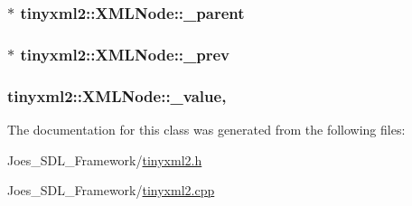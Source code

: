 \hypertarget{classtinyxml2_1_1_x_m_l_node_a176dd1c4965c21c366de192164aa2c13}{
\subsubsection[{\-\_\-parent}]{$\ast$ tinyxml2\-::\-X\-M\-L\-Node\-::\-\_\-parent\hspace{0.3cm}{\ttfamily [protected]}}}\label{classtinyxml2_1_1_x_m_l_node_a176dd1c4965c21c366de192164aa2c13}
\hypertarget{classtinyxml2_1_1_x_m_l_node_a9739eb0fb9a1188266052055e7a6bf6b}{
\subsubsection[{\-\_\-prev}]{$\ast$ tinyxml2\-::\-X\-M\-L\-Node\-::\-\_\-prev\hspace{0.3cm}{\ttfamily [protected]}}}\label{classtinyxml2_1_1_x_m_l_node_a9739eb0fb9a1188266052055e7a6bf6b}
\hypertarget{classtinyxml2_1_1_x_m_l_node_a3ea9884098b8379de2bb5ab3fc85c0fc}{
\subsubsection[{\-\_\-value}]{ tinyxml2\-::\-X\-M\-L\-Node\-::\-\_\-value\hspace{0.3cm}{\ttfamily [mutable]}, {\ttfamily [protected]}}}\label{classtinyxml2_1_1_x_m_l_node_a3ea9884098b8379de2bb5ab3fc85c0fc}


The documentation for this class was generated from the following files\-:\begin{DoxyCompactItemize}
\item 
Joes\-\_\-\-S\-D\-L\-\_\-\-Framework/\hyperlink{tinyxml2_8h}{tinyxml2.\-h}\item 
Joes\-\_\-\-S\-D\-L\-\_\-\-Framework/\hyperlink{tinyxml2_8cpp}{tinyxml2.\-cpp}\end{DoxyCompactItemize}
